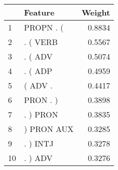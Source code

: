 \begin{tabular}{llr}
\toprule
{} &     Feature &  Weight \\
\midrule
1  &   PROPN . ( &  0.8834 \\
2  &    . ( VERB &  0.5567 \\
3  &     . ( ADV &  0.5074 \\
4  &     . ( ADP &  0.4959 \\
5  &     ( ADV . &  0.4417 \\
6  &    PRON . ) &  0.3898 \\
7  &    . ) PRON &  0.3835 \\
8  &  ) PRON AUX &  0.3285 \\
9  &    . ) INTJ &  0.3278 \\
10 &     . ) ADV &  0.3276 \\
\bottomrule
\end{tabular}
